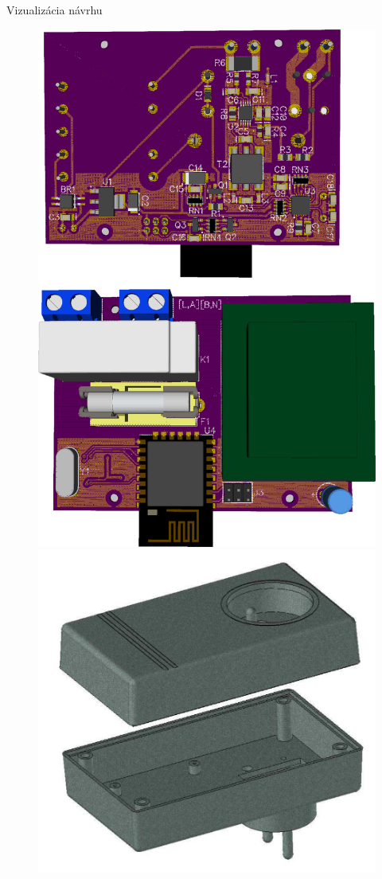 \documentclass[hyperref={unicode}]{beamer}
\begin{document}
\def \myGraphicsHeight {.60\paperheight}
\begin{frame}{Vizualizácia návrhu}
	\begin{figure}[htp]
		\centering
		\includegraphics[height=\myGraphicsHeight]{visualisation}
		\includegraphics[height=\myGraphicsHeight]{enclosure}

\end{figure}
\end{frame}
\end{document}
